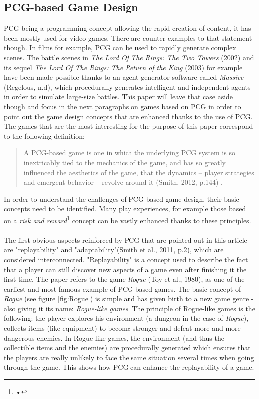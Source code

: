 \subsection{PCG-based Game Design}
PCG being a programming concept allowing the rapid creation of content, it has been mostly used for video games. There are counter examples to that statement though. In films for example, PCG can be used to rapidly generate complex scenes. The battle scenes in \textit{The Lord Of The Rings: The Two Towers} (2002)\cite{film:lotr2} and its sequel \textit{The Lord Of The Rings: The Return of the King} (2003)\cite{film:lotr3} for example have been made possible thanks to an agent generator software called \textit{Massive} (Regelous, n.d)\cite{soft:massive}, which procedurally generates intelligent and independent agents in order to simulate large-size battles. This paper will leave that case aside though and focus in the next paragraphs on games based on PCG in order to point out the game design concepts that are enhanced thanks to the use of PCG. The games that are the most interesting for the purpose of this paper correspond to the following definition:
\begin{quotation}
A PCG-based game is one in which the underlying PCG system is so inextricably tied to the mechanics of the game, and has so greatly influenced the aesthetics of the game, that the dynamics – player strategies and emergent behavior – revolve around it (Smith, 2012, p.144) \cite{pdf:smith}.
\end{quotation}
In order to understand the challenges of PCG-based game design, their basic concepts need to be identified. Many play experiences, for example those based on a \textit{risk and reward}\footnote{•} concept can be vastly enhanced thanks to these principles. 
\\\\
The first obvious aspects reinforced by PCG that are pointed out in this article are "replayability" and "adaptability"(Smith et al., 2011, p.2)\cite{pdf:pcgbased}, which are considered interconnected. "Replayability" is a concept used to describe the fact that a player can still discover new aspects of a game even after finishing it the first time. The paper refers to the game \textit{Rogue} (Toy et al., 1980)\cite{game:rogue}, as one of the earliest and most famous example of PCG-based games. The basic concept of \textit{Rogue} (see figure \ref{fig:Rogue}) is simple and has given birth to a new game genre - also giving it its name: \textit{Rogue-like games}. The principle of Rogue-like games is the following: the player explores his environment (a dungeon in the case of \textit{Rogue}), collects items (like equipment) to become stronger and defeat more and more dangerous enemies. In Rogue-like games, the environment (and thus the collectible items and the enemies) are procedurally generated which ensures that the players are really unlikely to face the same situation several times when going through the game. This shows how PCG can enhance the replayability of a game.
